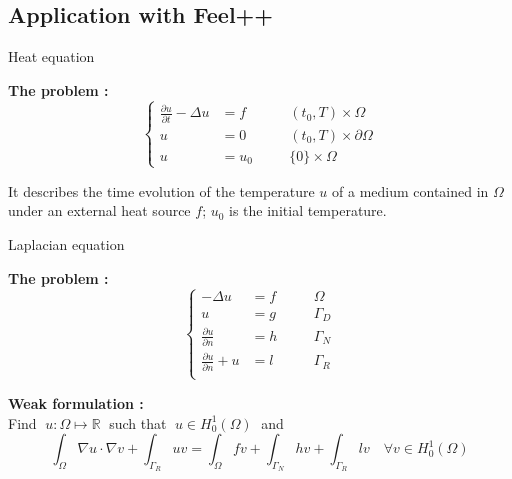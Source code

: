 \subsection{Application with Feel++}

\begin{frame}{Heat equation}
	
	\textbf{The problem :}
	$$\left\{\begin{aligned}
		\frac{\partial u}{\partial t}-\Delta u &= f \quad&&(t_0,T)\times\Omega \\
		u&=0 \quad&&(t_0,T)\times\partial\Omega\\
		u&=u_0 \quad &&\{0\}\times\Omega
	\end{aligned}\right.$$

	It describes the time evolution of the temperature $u$ of a medium contained in $\Omega$ under an external heat source $f$; $u_0$ is the initial temperature.
	
\end{frame}

\begin{frame}{Laplacian equation}
	
	\textbf{The problem :}
	$$\left\{\begin{aligned}
		-\Delta u &= f \quad&&\Omega \\
		u&=g \quad&&\Gamma_D \\
		\frac{\partial u}{\partial n} &=h \quad &&\Gamma_N \\
		\frac{\partial u}{\partial n}+u &=l \quad &&\Gamma_R \\
	\end{aligned}\right.$$
	
	\textbf{Weak formulation :} \\
	Find $\; u:\Omega \mapsto \mathbb{R} \;$ such that $\; u\in H_0^1(\Omega) \;$ and
	$$\int_\Omega \nabla u \cdot \nabla v + \int_{\Gamma_R}uv = \int_\Omega fv + \int_{\Gamma_N}hv+\int_{\Gamma_R}lv \quad \forall v\in H_0^1(\Omega)$$
	
\end{frame}

